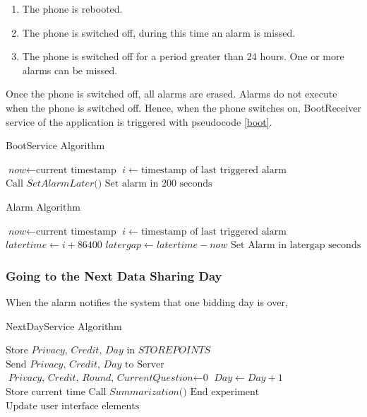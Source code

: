 \begin{enumerate}
	\item The phone is rebooted.
	\item The phone is switched off, during this time an alarm is missed.
    \item The phone is switched off for a period greater than 24 hours. One or more alarms can be missed.
\end{enumerate}

Once the phone is switched off, all alarms are erased. Alarms do not execute when the phone is switched off. Hence, when the phone switches on,
BootReceiver service of the application is triggered with pseudocode \ref{boot}.

\begin{algorithm}
\caption{BootService Algorithm}\label{boot}
\begin{algorithmic}[1]
\State $\textit{now} \gets \text{current timestamp}$
\State $i \gets \text{timestamp of last triggered alarm}$
  \State $\text{Call }\textit{SetAlarmLater()}$
\Else
  \State $\text{Set alarm in 200 seconds}$
\EndIf
\EndProcedure
\end{algorithmic}
\end{algorithm}



\begin{algorithm}
\caption{Alarm Algorithm}\label{setalarm}
\begin{algorithmic}[1]
\State $\textit{now} \gets \text{current timestamp}$
\State $i \gets \text{timestamp of last triggered alarm}$
\State $\textit{latertime} \gets \textit{i}+\text{86400}$
\State $\textit{latergap} \gets \textit{latertime}-\textit{now}$
\State $\text{Set Alarm in latergap seconds}$
\EndProcedure
\end{algorithmic}
\end{algorithm}

\subsubsection{Going to the Next Data Sharing Day} \label{next}
When the alarm notifies the system that one bidding day is over, 

\begin{algorithm}
\caption{NextDayService Algorithm}\label{nextday}
\begin{algorithmic}[1]
\State $\text{Store }\textit{Privacy, Credit, Day } \text{in } \textit{STOREPOINTS}$
\State $\text{Send }\textit{Privacy, Credit, Day } \text{to Server}$
\State $\textit{Privacy, Credit, Round, CurrentQuestion} \gets \text{0}$
\State $\textit{Day} \gets \textit{Day}+1$
\State $\text{Store current time}$
\State $\text{Call }\textit{Summarization()}$
  \State $\text{End experiment}$
\Else
  \State $\text{Update user interface elements}$ 
\EndIf
\EndProcedure
\end{algorithmic}
\end{algorithm}



